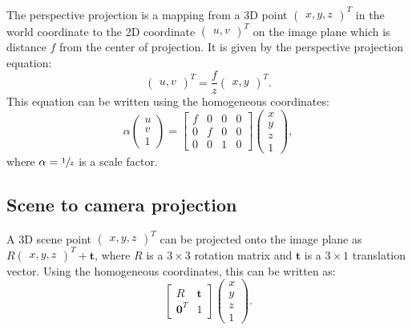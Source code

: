 The perspective projection is a mapping from a 3D point \(\begin{pmatrix}
	x, y, z
\end{pmatrix}^{T}\)
in the world coordinate
to the 2D coordinate \(\begin{pmatrix}
	u, v
\end{pmatrix}^{T}\)
on the image plane which is distance \(f\) from the center
of projection. It is given by the perspective projection equation:
\[
	\begin{pmatrix}
		u, v
	\end{pmatrix}^{T} = \frac{f}{z} \begin{pmatrix}
		x, y
	\end{pmatrix}^{T}.
\]
This equation can be written using the homogeneous coordinates:
\begin{equation} \label{eq:perspective_projection}
	\alpha \begin{pmatrix}
		u \\ v \\ 1
	\end{pmatrix} = \begin{bmatrix}
		f & 0 & 0 & 0 \\
		0 & f & 0 & 0 \\
		0 & 0 & 1 & 0
	\end{bmatrix} \begin{pmatrix}
		x \\ y \\ z \\ 1
	\end{pmatrix},
\end{equation}
where \(\alpha = \sfrac{1}{z}\) is a scale factor.

\subsection{Scene to camera projection}\label{sub:scene_to_camera_projection}

A 3D scene point \(\begin{pmatrix}
	x, y, z
\end{pmatrix}^{T}\) can be projected onto the image plane as
\(R \begin{pmatrix}
	x, y, z
\end{pmatrix}^{T} + \mathbf{t}\), where \(R\) is a \(3 \times 3\) rotation matrix
and \(\mathbf{t}\) is
a \(3 \times 1\) translation vector. Using the homogeneous coordinates, this
can be written as:
\begin{equation}
	\begin{bmatrix}
		R              & \mathbf{t} \\
		\mathbf{0}^{T} & 1
	\end{bmatrix} \begin{pmatrix}
		x \\ y \\ z \\ 1
	\end{pmatrix}.
\end{equation}

